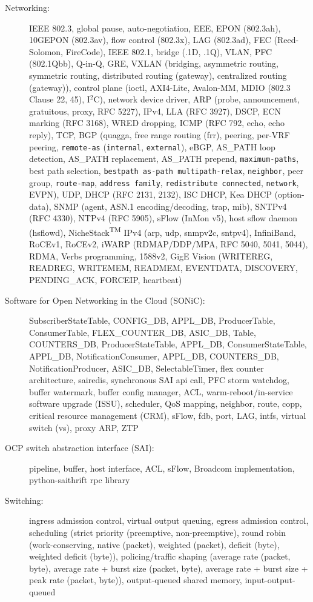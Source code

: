\documentclass[letterpaper,11pt]{article}
\begin{document}
\begin{description}
\item[Networking:] IEEE 802.3, global pause, auto-negotiation, EEE, EPON (802.3ah), 10GEPON (802.3av), flow control (802.3x), LAG (802.3ad),
FEC (Reed-Solomon, FireCode),
IEEE 802.1, bridge (.1D, .1Q), VLAN, PFC (802.1Qbb), Q-in-Q, GRE, VXLAN (bridging, asymmetric routing, symmetric routing,
distributed routing (gateway), centralized routing (gateway)),
control plane (ioctl, AXI4-Lite, Avalon-MM, MDIO (802.3 Clause 22, 45), I$^2$C),
network device driver, ARP (probe, announcement, gratuitous, proxy, RFC 5227), IPv4, LLA (RFC 3927), DSCP, ECN marking (RFC 3168), WRED dropping,
ICMP (RFC 792, echo, echo reply),
TCP, BGP (quagga, free range routing (frr), peering, per-VRF peering, {\tt remote-as} ({\tt internal}, {\tt external}), eBGP,
AS\_PATH loop detection, AS\_PATH replacement, AS\_PATH prepend,
{\tt maximum-paths}, best path selection,
{\tt bestpath as-path multipath-relax}, {\tt neighbor}, peer group, {\tt route-map},
{\tt address family},
{\tt redistribute connected}, {\tt network}, EVPN),
UDP, DHCP (RFC 2131, 2132), ISC DHCP, Kea DHCP (option-data), SNMP (agent, ASN.1 encoding/decoding, trap, mib), SNTPv4 (RFC 4330), NTPv4 (RFC 5905),
sFlow (InMon v5), host sflow daemon (hsflowd),
%
NicheStack\textsuperscript{TM} IPv4 (arp, udp, snmpv2c, sntpv4),
%
InfiniBand, RoCEv1, RoCEv2,
iWARP (RDMAP/DDP/MPA, RFC 5040, 5041, 5044), RDMA, Verbs programming,
%
1588v2,
GigE Vision (WRITEREG, READREG, WRITEMEM, READMEM, EVENTDATA, DISCOVERY, PENDING\_ACK, FORCEIP, heartbeat)

\item[Software for Open Networking in the Cloud (SONiC):] SubscriberStateTable, CONFIG\_DB, APPL\_DB,
ProducerTable, ConsumerTable, FLEX\_COUNTER\_DB, ASIC\_DB,
Table, COUNTERS\_DB,
ProducerStateTable, APPL\_DB, ConsumerStateTable, APPL\_DB,
%
NotificationConsumer, APPL\_DB, COUNTERS\_DB, NotificationProducer, ASIC\_DB,
SelectableTimer,
flex counter architecture, sairedis, synchronous SAI api call, PFC storm watchdog,
buffer watermark, buffer config manager, ACL, warm-reboot/in-service software upgrade (ISSU), scheduler, QoS mapping,
neighbor, route, copp, critical resource management (CRM), sFlow, fdb, port, LAG, intfs,
virtual switch (vs), proxy ARP, ZTP

\item[OCP switch abstraction interface (SAI):] pipeline, buffer, host interface, ACL, sFlow,
Broadcom implementation, python-saithrift rpc library

\item[Switching:] ingress admission control, virtual output queuing, egress admission control,
scheduling (strict priority (preemptive, non-preemptive),
round robin (work-conserving, native (packet), weighted (packet), deficit (byte), weighted deficit (byte)),
policing/traffic shaping (average rate (packet, byte), average rate + burst size (packet, byte), average rate + burst size + peak rate (packet, byte)),
output-queued shared memory, input-output-queued


\end{description}
\end{document}
